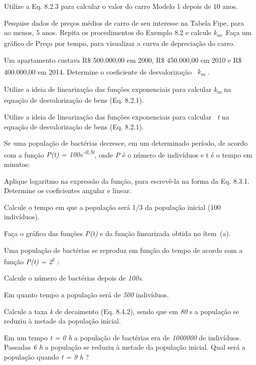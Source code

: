 \begin{exercicios}
    \exitem{} Utilize a Eq. 8.2.3 para calcular o valor do carro Modelo 1 depois de 10 anos.

	\exitem{} Pesquise dados de preços médios de carro de seu interesse na Tabela Fipe, para ao menos, 5 anos. Repita os procedimentos do Exemplo 8.2 e calcule \textit{k\textsubscript{m}}. Faça um gráfico de Preço por tempo, para visualizar a curva de depreciação do carro.

	\exitem{} Um apartamento custava R$\$$  500.000,00 em 2000, R$\$$  450.000,00 em 2010 e R$\$$  400.000,00 em 2014. Determine o coeficiente de desvalorização~ \textit{k\textsubscript{m}\textsuperscript{ }}.

	\exitem{} Utilize a ideia de linearização das funções exponenciais para calcular \textit{k\textsubscript{m}} na equação de desvalorização de bens (Eq. 8.2.1).

	\exitem{} Utilize a ideia de linearização das funções exponenciais para calcular~ \textit{t }na equação de desvalorização de bens (Eq. 8.2.1).

	\exitem{} Se uma população de bactérias decresce, em um determinado período, de acordo com a função \textit{P(t) = 100e\textsuperscript{-0,5t}}, onde \textit{P} é o número de indivíduos e t é o tempo em minutos:

	\exitem{} Aplique logaritmo na expressão da função, para escrevê-la na forma da Eq. 8.3.1. Determine os coeficientes angular e linear.

	\exitem{} Calcule o tempo em que a população será 1/3 da população inicial (100 indivíduos).

	\exitem{} Faça o gráfico das funções \textit{P(t)} e da função linearizada obtida no ítem~(a).  

	\item Uma população de bactérias se reproduz em função do tempo de acordo com a função  \textit{P(t) = 2\textsuperscript{t} :}

	\item Calcule o número de bactérias depois de \textit{100s}. 

	\item Em quanto tempo a população será de \textit{500} indivíduos.

	\item Calcule a taxa \textit{k} de decaimento (Eq. 8.4.2), sendo que em \textit{80} s a população se reduziu à metade da população inicial.

	\item Em um tempo \textit{t = 0 h} a população de bactérias era de \textit{1000000} de indivíduos. Passadas \textit{6 h} a população se reduziu à metade da população inicial. Qual será a população quando \textit{t = 9 h} ?


\end{exercicios}
